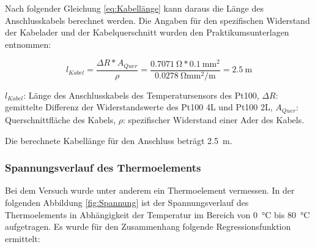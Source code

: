 Nach folgender Gleichung \ref{eq:Kabellänge} kann daraus die Länge des Anschlusskabels berechnet werden. Die Angaben für den spezifischen Widerstand der Kabelader und der Kabelquerschnitt wurden den Praktikumsunterlagen entnommen:

\begin{equation}
\label{eq:Kabellänge}
l_{Kabel}= \frac{\Delta R*A_{Quer}}{\rho}=\frac{\SI{0,7071}{\ohm}*\SI{0,1}{\milli\meter\squared}}{\SI{0,0278}{\ohm\milli\meter\squared\per\meter}}=\SI{2,5}{\meter}
\end{equation}

\begin{center}
	\begin{small}
		$l_{Kabel}$: Länge des Anschlusskabels des Temperatursensors des Pt100,
		$\Delta R$: gemittelte Differenz der Widerstandswerte des Pt100 4L und Pt100 2L,
		$A_{Quer}$: Querschnittfläche des Kabels,
		$\rho$: spezifischer Widerstand einer Ader des Kabels.
	\end{small}
\end{center}

Die berechnete Kabellänge für den Anschluss beträgt \SI{2,5}{\meter}.

\subsubsection{Spannungsverlauf des Thermoelements}

Bei dem Versuch wurde unter anderem ein Thermoelement vermessen. In der folgenden Abbildung \ref{fig:Spannung} ist der Spannungsverlauf des Thermoelements in Abhängigkeit der Temperatur im Bereich von \SI{0}{\celsius} bis \SI{80}{\celsius} aufgetragen. Es wurde für den Zusammenhang folgende Regressionsfunktion ermittelt:
	
